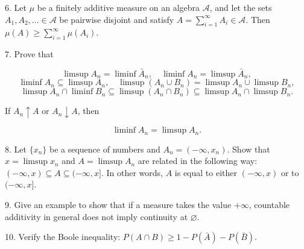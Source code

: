 6. Let $\mu$ be a finitely additive measure on an algebra $\mathcal{A}$, and let the sets $A_1, A_2, \ldots \in \mathcal{A}$ be pairwise disjoint and satisfy $A = \sum_{i=1}^{\infty} A_i \in \mathcal{A}$. Then $\mu(A) \geq \sum_{i=1}^{\infty} \mu(A_i)$.

7. Prove that

$$\limsup A_n = \liminf \bar{A}_n, \quad \liminf A_n = \limsup \bar{A}_n,$$
$$\liminf A_n \subseteq \limsup A_n, \quad \limsup(A_n \cup B_n) = \limsup A_n \cup \limsup B_n,$$
$$\limsup A_n \cap \liminf B_n \subseteq \limsup(A_n \cap B_n) \subseteq \limsup A_n \cap \limsup B_n.$$

If $A_n \uparrow A$ or $A_n \downarrow A$, then

$$\liminf A_n = \limsup A_n.$$

8. Let $\{x_n\}$ be a sequence of numbers and $A_n = (-\infty, x_n)$. Show that $x = \limsup x_n$ and $A = \limsup A_n$ are related in the following way: $(-\infty, x) \subseteq A \subseteq (-\infty, x]$. In other words, $A$ is equal to either $(-\infty, x)$ or to $(-\infty, x]$.

9. Give an example to show that if a measure takes the value $+\infty$, countable additivity in general does not imply continuity at $\varnothing$.

10. Verify the Boole inequality: $P(A \cap B) \geq 1 - P(\bar{A}) - P(\bar{B})$.

